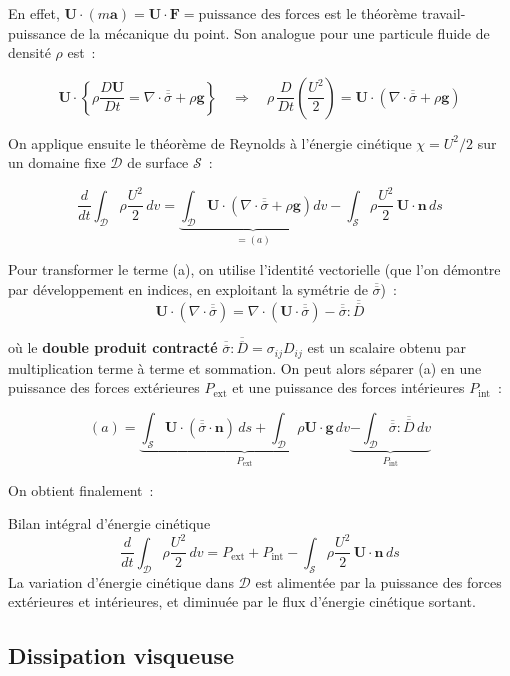 \documentclass[11pt,a4paper]{report}
\newcommand{\DD}[1]{\dfrac{D #1}{Dt}}
\newcommand{\ten}[1]{\overline{\overline{#1}}}   %
\begin{document}
En effet, $\bm{U}\cdot(m\bm{a}) = \bm{U}\cdot\bm{F} = \text{puissance des forces}$
est le théorème travail-puissance de la mécanique du point. Son analogue pour une
particule fluide de densité $\rho$ est~:

\[
    \bm{U}\cdot\left\{\rho\DD{\bm{U}} = \nabla\cdot\ten{\sigma}+\rho\bm{g}\right\}
    \quad\Longrightarrow\quad
    \rho\,\DD{}\!\left(\frac{U^2}{2}\right) = \bm{U}\cdot\left(\nabla\cdot\ten{\sigma}+\rho\bm{g}\right)
\]

On applique ensuite le théorème de Reynolds à l'énergie cinétique $\chi=U^2/2$
sur un domaine fixe $\mathcal{D}$ de surface $\mathcal{S}$~:

\[
    \frac{d}{dt}\int_{\mathcal{D}}\rho\frac{U^2}{2}\,dv
    = \underbrace{\int_{\mathcal{D}}\bm{U}\cdot\left(\nabla\cdot\ten{\sigma}+\rho\bm{g}\right)dv}_{=(a)}
    - \int_{\mathcal{S}}\rho\frac{U^2}{2}\,\bm{U}\cdot\bm{n}\,ds
\]

Pour transformer le terme (a), on utilise l'identité vectorielle (que l'on
démontre par développement en indices, en exploitant la symétrie de $\ten{\sigma}$)~:
\[
    \bm{U}\cdot(\nabla\cdot\ten{\sigma})
    = \nabla\cdot(\bm{U}\cdot\ten{\sigma}) - \ten{\sigma}:\ten{D}
\]

où le \textbf{double produit contracté} $\ten{\sigma}:\ten{D}=\sigma_{ij}D_{ij}$
est un scalaire obtenu par multiplication terme à terme et sommation.
On peut alors séparer (a) en une puissance des forces extérieures $P_\text{ext}$
et une puissance des forces intérieures $P_\text{int}$~:

\[
    (a) = \underbrace{\int_{\mathcal{S}}\bm{U}\cdot(\ten{\sigma}\cdot\bm{n})\,ds
          + \int_{\mathcal{D}}\rho\bm{U}\cdot\bm{g}\,dv}_{P_\text{ext}}
          \underbrace{- \int_{\mathcal{D}}\ten{\sigma}:\ten{D}\,dv}_{P_\text{int}}
\]

On obtient finalement~:

\begin{importantbox}{Bilan intégral d'énergie cinétique}
\[
    \frac{d}{dt}\int_{\mathcal{D}}\rho\frac{U^2}{2}\,dv
    = P_\text{ext} + P_\text{int} - \int_{\mathcal{S}}\rho\frac{U^2}{2}\,\bm{U}\cdot\bm{n}\,ds
    \tag{13}
\]
La variation d'énergie cinétique dans $\mathcal{D}$ est alimentée par la puissance
des forces extérieures et intérieures, et diminuée par le flux d'énergie cinétique
sortant.
\end{importantbox}

\subsection{Dissipation visqueuse}
\end{document}

